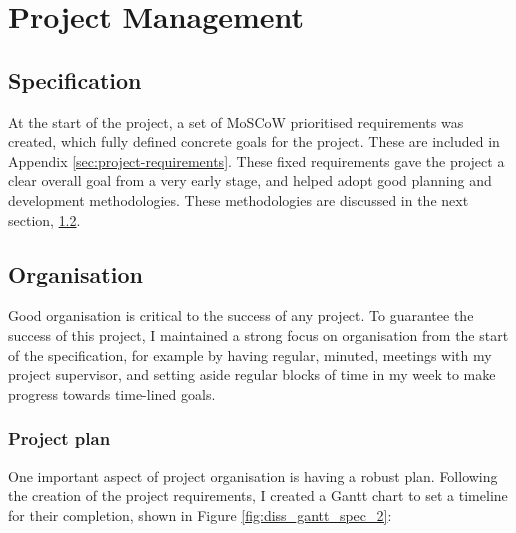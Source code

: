 \chapter{Project Management}
\label{ch:project-management}

\section{Specification}
\label{sec:specification}

At the start of the project, a set of MoSCoW prioritised \cite{CaseMethodFastTrack} requirements was created, which fully defined concrete goals for the project. These are included in Appendix \ref{sec:project-requirements}. These fixed requirements gave the project a clear overall goal from a very early stage, and helped adopt good planning and development methodologies. These methodologies are discussed in the next section, \ref{sec:organisation}.

\section{Organisation}
\label{sec:organisation}

Good organisation is critical to the success of any project. To guarantee the success of this project, I maintained a strong focus on organisation from the start of the specification, for example by having regular, minuted, meetings with my project supervisor, and setting aside regular blocks of time in my week to make progress towards time-lined goals.

\subsection{Project plan}
\label{ssec:organisation-plan}

One important aspect of project organisation is having a robust plan. Following the creation of the project requirements, I created a Gantt chart to set a timeline for their completion, shown in Figure \ref{fig:diss_gantt_spec_2}:

